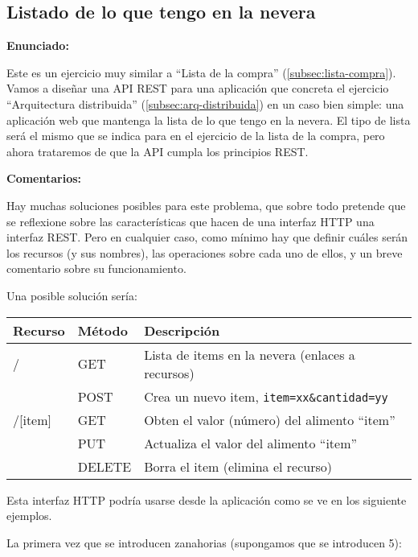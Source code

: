 \subsection{Listado de lo que tengo en la nevera}
\label{subsec:contenido-nevera}

\textbf{Enunciado:}

Este es un ejercicio muy similar a ``Lista de la compra'' (\ref{subsec:lista-compra}). Vamos a diseñar una API REST para una aplicación que concreta el ejercicio ``Arquitectura distribuida'' (\ref{subsec:arq-distribuida}) en un caso bien simple: una aplicación web que mantenga la lista de lo que tengo en la nevera. El tipo de lista será el mismo que se indica para en el ejercicio de la lista de la compra, pero ahora trataremos de que la API cumpla los principios REST.

\textbf{Comentarios:}

Hay muchas soluciones posibles para este problema, que sobre todo pretende que se reflexione sobre las características que hacen de una interfaz HTTP una interfaz REST. Pero en cualquier caso, como mínimo hay que definir cuáles serán los recursos (y sus nombres), las operaciones sobre cada uno de ellos, y un breve comentario sobre su funcionamiento.

Una posible solución sería: \\

\begin{tabular}{l|l|p{10cm}}
  Recurso & Método & Descripción \\ \hline \hline
  /       & GET    & Lista de items en la nevera (enlaces a recursos) \\
          & POST   & Crea un nuevo item, \verb|item=xx&cantidad=yy| \\
  /[item] & GET    & Obten el valor (número) del alimento ``item'' \\
          & PUT    & Actualiza el valor del alimento ``item'' \\
          & DELETE & Borra el item (elimina el recurso) \\
\end{tabular}

Esta interfaz HTTP podría usarse desde la aplicación como se ve en los siguiente ejemplos.

La primera vez que se introducen zanahorias (supongamos que se introducen 5):

